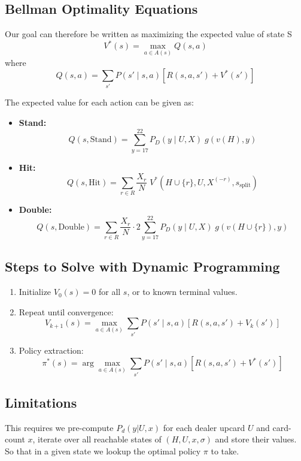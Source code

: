 \documentclass[12pt,a4paper]{cibb}
\begin{document}
\subsection*{Bellman Optimality Equations}

Our goal can therefore be written as maximizing the expected value of state S
\[
  V^*(s) = \max_{a \in A(s)} Q(s, a)
\]
where
\[
  Q(s,a) = \sum_{s'} P(s' \mid s, a) \left[ R(s,a,s') + V^*(s') \right]
\]

The expected value for each action can be given as:

\begin{itemize}
  \item \textbf{Stand:}
  \[
    Q(s, \mathrm{Stand}) = \sum_{y=17}^{22} P_D(y \mid U, X)\; g(v(H), y)
  \]

  \item \textbf{Hit:}
  \[
    Q(s, \mathrm{Hit}) = \sum_{r \in R} \frac{X_r}{N}\; V^*(H \cup \{r\}, U, X^{(-r)}, s_{\text{split}})
  \]

  \item \textbf{Double:}
  \[
    Q(s, \mathrm{Double}) = \sum_{r \in R} \frac{X_r}{N} \cdot 2 \sum_{y=17}^{22} P_D(y \mid U, X)\; g(v(H \cup \{r\}), y)
  \]
\end{itemize}

\subsection{Steps to Solve with Dynamic Programming}

\begin{enumerate}
  \item Initialize \( V_0(s) = 0 \) for all \( s \), or to known terminal values.
  \item Repeat until convergence:
  \[
    V_{k+1}(s) = \max_{a \in A(s)} \sum_{s'} P(s' \mid s, a) [ R(s,a,s') + V_k(s') ]
  \]
  \item Policy extraction:
  \[
    \pi^*(s) = \arg\max_{a \in A(s)} \sum_{s'} P(s' \mid s,a) [ R(s,a,s') + V^*(s') ]
  \]
\end{enumerate}

\subsection{Limitations}
This requires we pre-compute $P_d(y|U, x)$ for each dealer upcard $U$ and card-count $x$, iterate over all reachable states of $(H, U, x, σ)$ and store their values. So that in a given state we lookup the optimal policy $π$ to take.
\end{document}

